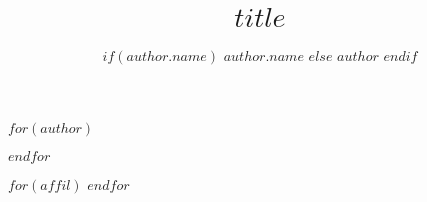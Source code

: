 \providecommand{\tightlist}{%
  \setlength{\itemsep}{0pt}\setlength{\parskip}{0pt}}
\usepackage{amsmath,amsfonts,amssymb}
\usepackage{graphicx}
\usepackage{siunitx}
\usepackage[colorlinks=true, allcolors=blue]{hyperref}
\renewcommand{\baselinestretch}{1.0} %
 
\title{$title$}
$for(author)$
\author[$if(author.affil)$
  $author.affil$
  $endif$]{
$if(author.name)$
$author.name$
$else$
$author$
$endif$}
$endfor$

$for(affil)$
$endfor$











\pagestyle{empty} %
